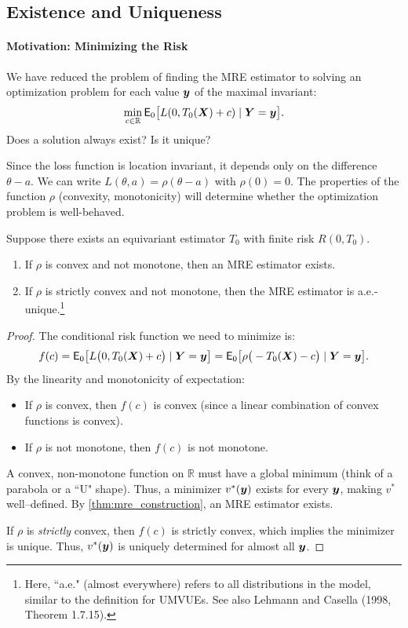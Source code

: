\subsection{Existence and Uniqueness}
\label{subsec:exist_unique}

\paragraph{Motivation: Minimizing the Risk}
We have reduced the problem of finding the MRE estimator to solving an optimization problem for each value \(\boldsymbol{y}\) of the maximal invariant:
\[
\min_{c \in \mathbb{R}} \mathsf{E}_0 \big[ L(0, T_0(\boldsymbol{X}) + c) \mid \boldsymbol{Y} = \boldsymbol{y} \big].
\]
Does a solution always exist? Is it unique?

Since the loss function is location invariant, it depends only on the difference \(\theta - a\). We can write \(L(\theta, a) = \rho(\theta - a)\) with \(\rho(0) = 0\). The properties of the function \(\rho\) (convexity, monotonicity) will determine whether the optimization problem is well-behaved.

\begin{pro}
\label{prop:mre_existence}
Suppose there exists an equivariant estimator \(T_0\) with finite risk \(R(0,T_0)\).
\begin{enumerate}
\item If \(\rho\) is convex and not monotone, then an MRE estimator exists.
\item If \(\rho\) is strictly convex and not monotone, then the MRE estimator is a.e.-unique.\footnote{Here, ``a.e." (almost everywhere) refers to all distributions in the model, similar to the definition for UMVUEs. See also Lehmann and Casella (1998, Theorem 1.7.15).}
\end{enumerate}
\end{pro}

\begin{proof}
The conditional risk function we need to minimize is:
\[
f(c) = \mathsf{E}_0 \big[ L \big( 0, T_0(\boldsymbol{X}) + c \big) \mid \boldsymbol{Y} = \boldsymbol{y} \big] = \mathsf{E}_0 \big[ \rho \big( -T_0(\boldsymbol{X}) - c \big) \mid \boldsymbol{Y} = \boldsymbol{y} \big].
\]
By the linearity and monotonicity of expectation:
\begin{itemize}
    \item If \(\rho\) is convex, then \(f(c)\) is convex (since a linear combination of convex functions is convex).
    \item If \(\rho\) is not monotone, then \(f(c)\) is not monotone.
\end{itemize}
A convex, non-monotone function on \(\mathbb{R}\) must have a global minimum (think of a parabola or a ``U" shape). Thus, a minimizer \(v^*(\boldsymbol{y})\) exists for every \(\boldsymbol{y}\), making \(v^*\) well--defined. By \autoref{thm:mre_construction}, an MRE estimator exists.

If \(\rho\) is \textit{strictly} convex, then \(f(c)\) is strictly convex, which implies the minimizer is unique. Thus, \(v^*(\boldsymbol{y})\) is uniquely determined for almost all \(\boldsymbol{y}\).
\end{proof}

